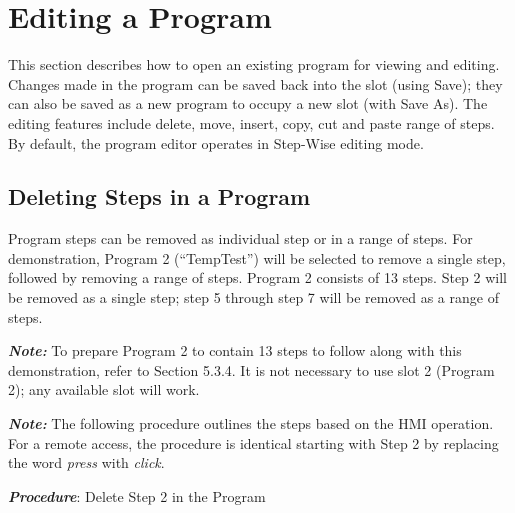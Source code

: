 \section{Editing a Program}

This section describes how to open an existing program for viewing and
editing. Changes made in the program can be saved back into the slot
(using Save); they can also be saved as a new program to occupy a new
slot (with Save As). The editing features include delete, move, insert,
copy, cut and paste range of steps. By default, the program editor
operates in Step-Wise editing mode.


\subsection{Deleting Steps in a
Program}

Program steps can be removed as individual step or in a range of steps.
For demonstration, Program 2 (``TempTest'') will be selected to remove a
single step, followed by removing a range of steps. Program 2 consists
of 13 steps. Step 2 will be removed as a single step; step 5 through
step 7 will be removed as a range of steps.

\textbf{\emph{Note:}} To prepare Program 2 to contain 13 steps to follow
along with this demonstration, refer to Section 5.3.4. It is not
necessary to use slot 2 (Program 2); any available slot will work.

\textbf{\emph{Note:}} The following procedure outlines the steps based
on the HMI operation. For a remote access, the procedure is identical
starting with Step 2 by replacing the word \emph{press} with
\emph{click}.

\textbf{\emph{Procedure}}: Delete Step 2 in the Program

